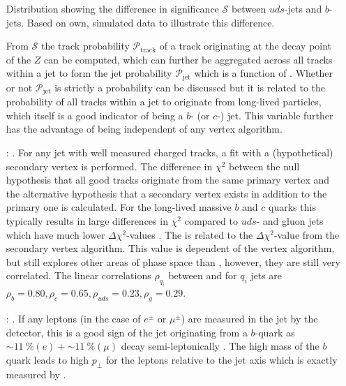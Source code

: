 \begin{enumerate}[leftmargin=*,labelindent=16pt]
\begin{marginfigure}[-0.5cm]
    \caption[Track Significance]{Distribution showing the difference in significance $\mathcal{S}$ between $uds$-jets and $b$-jets. Based on own, simulated data to illustrate this difference.}
    \label{fig:hep:significance}
  \end{marginfigure} 
  \noindent From $\mathcal{S}$ the track probability $\mathcal{P}_\mathrm{track}$ of a track originating at the decay point of the $Z$ can be computed, which can further be aggregated across all tracks within a jet to form the jet probability $\mathcal{P}_\mathrm{jet}$ which  is a function of \autocite{buskulicPreciseMeasurementGZ1993}. 
  Whether or not $\mathcal{P}_\mathrm{jet}$ is strictly a probability can be discussed but it is related to the probability of all tracks within a jet to originate from long-lived particles, which itself is a good indicator of being a $b$- (or $c$-) jet. This variable further has the advantage of being independent of any vertex algorithm.


  \item[\hspace{0.5cm} \code{bqvjet}:] . For any jet with well measured charged tracks, a fit with a (hypothetical) secondary vertex is performed. The difference in $\chi^2$ between the null hypothesis that all good tracks originate from the same primary vertex and the alternative hypothesis that a secondary vertex exists in addition to the primary one is calculated. For the long-lived massive $b$ and $c$ quarks this typically results in large differences in $\chi^2$ compared to $uds$- and gluon jets which have much lower $\Delta \chi^2$-values \citep{Armstrong1998hy}. The  is related to the $\Delta \chi^2$-value from the secondary vertex algorithm. This value is dependent of the vertex algorithm, but still explores other areas of phase space than , however, they are still very correlated. The linear correlations $\rho_{q_i}$ between  and  for $q_i$ jets are $\rho_b = 0.80, \rho_c = 0.65, \rho_{uds} = 0.23, \rho_g = 0.29$.  

  \item[\hspace{0.5cm} \code{ptlrel}:] . If any leptons (in the case of $e^\pm$ or $\mu^\pm$) are measured in the jet by the detector, this is a good sign of the jet originating from a $b$-quark as ${\sim\SI{11}{\percent} (e)} + {\sim\SI{11}{\percent} (\mu)}$ decay semi-leptonically \autocite{albrechtModelindependentDeterminationInclusive1993}. The high mass of the $b$ quark leads to high $p_\perp$ for the leptons relative to the jet axis which is exactly measured by .
\end{enumerate}


